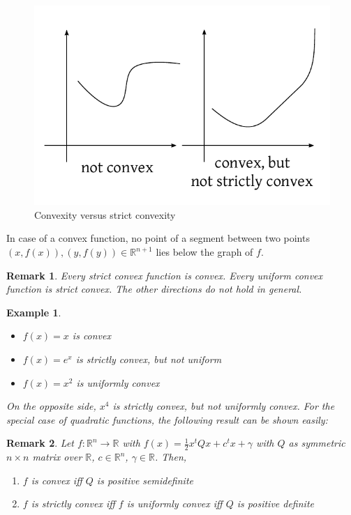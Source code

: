 \documentclass[a4paper]{article}
\numberwithin{lecref}{subsection}
\newtheorem*{Example}{Example}
\newtheorem*{Remark}{Remark}
\begin{document}
\begin{figure}[t]
	\begin{center}
		\includegraphics{img/20_strict_convexity.pdf}
		\caption{Convexity versus strict convexity}
		\label{img:convexity}
	\end{center}
\end{figure}

In case of a convex function, no point of a segment between two points $(x, f(x)), (y, f(y)) \in \mathbb R^{n+1}$ lies below the graph of $f$.

\begin{Remark}
	Every strict convex function is convex.
	Every uniform convex function is strict convex.
	The other directions do not hold in general.
\end{Remark}

\begin{Example}
	\begin{itemize}
		\item $f(x) = x$ is convex
		\item $f(x) = e^x$ is strictly convex, but not uniform
		\item $f(x) = x^2$ is uniformly convex
	\end{itemize}
	On the opposite side, $x^4$ is strictly convex, but not uniformly convex.
	For the special case of quadratic functions, the following result can be shown easily:
\end{Example}

\begin{Remark}
	Let $f: \mathbb R^n \to \mathbb R$ with $f(x) = \frac12 x^t Qx + c^t x + \gamma$ with $Q$ as symmetric $n \times n$ matrix over $\mathbb R$, $c \in \mathbb R^n$, $\gamma \in \mathbb R$. Then,
	\begin{enumerate}
		\item $f$ is convex iff $Q$ is positive semidefinite
		\item $f$ is strictly convex iff $f$ is uniformly convex iff $Q$ is positive definite
	\end{enumerate}
\end{Remark}
\end{document}
